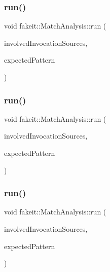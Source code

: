\subsubsection{\texorpdfstring{run()}{run()}\hspace{0.1cm}{\footnotesize\ttfamily [6/9]}}
{\footnotesize\ttfamily void fakeit\+::\+Match\+Analysis\+::run (\begin{DoxyParamCaption}\item[{\mbox{\hyperlink{structfakeit_1_1InvocationsSourceProxy}{Invocations\+Source\+Proxy}} \&}]{involved\+Invocation\+Sources,  }\item[{std\+::vector$<$ \mbox{\hyperlink{classfakeit_1_1Sequence}{Sequence}} $\ast$ $>$ \&}]{expected\+Pattern }\end{DoxyParamCaption})\hspace{0.3cm}{\ttfamily [inline]}}

\mbox{\label{structfakeit_1_1MatchAnalysis_a6c064d01a4c375d30898208326ee3189}} 
\subsubsection{\texorpdfstring{run()}{run()}\hspace{0.1cm}{\footnotesize\ttfamily [7/9]}}
{\footnotesize\ttfamily void fakeit\+::\+Match\+Analysis\+::run (\begin{DoxyParamCaption}\item[{\mbox{\hyperlink{structfakeit_1_1InvocationsSourceProxy}{Invocations\+Source\+Proxy}} \&}]{involved\+Invocation\+Sources,  }\item[{std\+::vector$<$ \mbox{\hyperlink{classfakeit_1_1Sequence}{Sequence}} $\ast$ $>$ \&}]{expected\+Pattern }\end{DoxyParamCaption})\hspace{0.3cm}{\ttfamily [inline]}}

\mbox{\label{structfakeit_1_1MatchAnalysis_a6c064d01a4c375d30898208326ee3189}} 
\subsubsection{\texorpdfstring{run()}{run()}\hspace{0.1cm}{\footnotesize\ttfamily [8/9]}}
{\footnotesize\ttfamily void fakeit\+::\+Match\+Analysis\+::run (\begin{DoxyParamCaption}\item[{\mbox{\hyperlink{structfakeit_1_1InvocationsSourceProxy}{Invocations\+Source\+Proxy}} \&}]{involved\+Invocation\+Sources,  }\item[{std\+::vector$<$ \mbox{\hyperlink{classfakeit_1_1Sequence}{Sequence}} $\ast$ $>$ \&}]{expected\+Pattern }\end{DoxyParamCaption})\hspace{0.3cm}{\ttfamily [inline]}}

